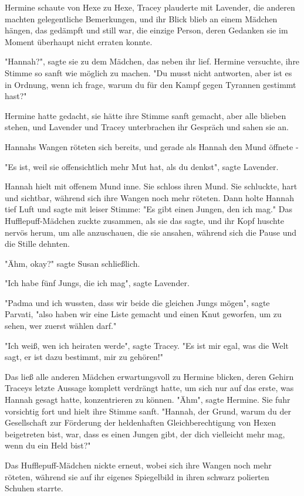 {Hermine schaute von Hexe zu Hexe, Tracey plauderte mit Lavender, die anderen machten gelegentliche Bemerkungen, und ihr Blick blieb an einem Mädchen hängen, das gedämpft und still war, die einzige Person, deren Gedanken sie im Moment überhaupt nicht erraten konnte.

"Hannah?", sagte sie zu dem Mädchen, das neben ihr lief. Hermine versuchte, ihre Stimme so sanft wie möglich zu machen. "Du musst nicht antworten, aber ist es in Ordnung, wenn ich frage, warum du für den Kampf gegen Tyrannen gestimmt hast?"

Hermine hatte gedacht, sie hätte ihre Stimme sanft gemacht, aber alle blieben stehen, und Lavender und Tracey unterbrachen ihr Gespräch und sahen sie an.

Hannahs Wangen röteten sich bereits, und gerade als Hannah den Mund öffnete -

"Es ist, weil sie offensichtlich mehr Mut hat, als du denkst", sagte Lavender.

Hannah hielt mit offenem Mund inne. Sie schloss ihren Mund. Sie schluckte, hart und sichtbar, während sich ihre Wangen noch mehr röteten. Dann holte Hannah tief Luft und sagte mit leiser Stimme: "Es gibt einen Jungen, den ich mag." Das Hufflepuff-Mädchen zuckte zusammen, als sie das sagte, und ihr Kopf huschte nervös herum, um alle anzuschauen, die sie ansahen, während sich die Pause und die Stille dehnten.

"Ähm, okay?" sagte Susan schließlich.

"Ich habe fünf Jungs, die ich mag", sagte Lavender.

"Padma und ich wussten, dass wir beide die gleichen Jungs mögen", sagte Parvati, "also haben wir eine Liste gemacht und einen Knut geworfen, um zu sehen, wer zuerst wählen darf."

"Ich weiß, wen ich heiraten werde", sagte Tracey. "Es ist mir egal, was die Welt sagt, er ist dazu bestimmt, mir zu gehören!"

Das ließ alle anderen Mädchen erwartungsvoll zu Hermine blicken, deren Gehirn Traceys letzte Aussage komplett verdrängt hatte, um sich nur auf das erste, was Hannah gesagt hatte, konzentrieren zu können. "Ähm", sagte Hermine. Sie fuhr vorsichtig fort und hielt ihre Stimme sanft. "Hannah, der Grund, warum du der Gesellschaft zur Förderung der heldenhaften Gleichberechtigung von Hexen beigetreten bist, war, dass es einen Jungen gibt, der dich vielleicht mehr mag, wenn du ein Held bist?"

Das Hufflepuff-Mädchen nickte erneut, wobei sich ihre Wangen noch mehr röteten, während sie auf ihr eigenes Spiegelbild in ihren schwarz polierten Schuhen starrte.

}
